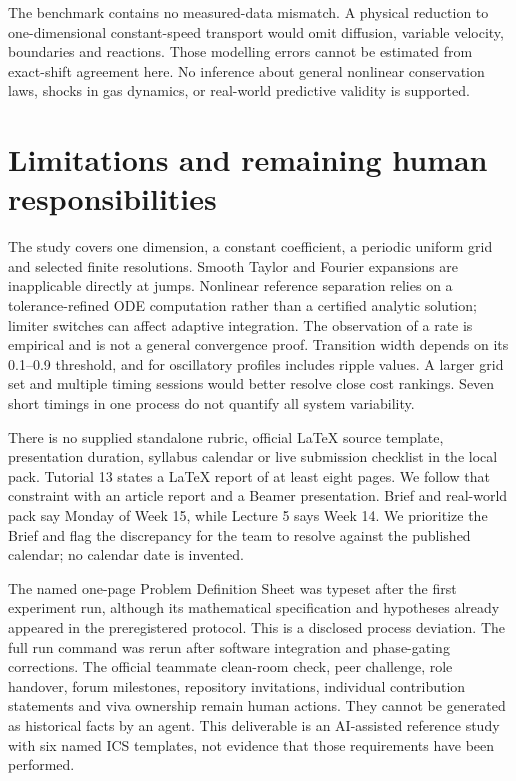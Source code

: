 The benchmark contains no measured-data mismatch. A physical reduction to one-dimensional constant-speed transport would omit diffusion, variable velocity, boundaries and reactions. Those modelling errors cannot be estimated from exact-shift agreement here. No inference about general nonlinear conservation laws, shocks in gas dynamics, or real-world predictive validity is supported.

\section{Limitations and remaining human responsibilities}
The study covers one dimension, a constant coefficient, a periodic uniform grid and selected finite resolutions. Smooth Taylor and Fourier expansions are inapplicable directly at jumps. Nonlinear reference separation relies on a tolerance-refined ODE computation rather than a certified analytic solution; limiter switches can affect adaptive integration. The observation of a rate is empirical and is not a general convergence proof. Transition width depends on its 0.1--0.9 threshold, and for oscillatory profiles includes ripple values. A larger grid set and multiple timing sessions would better resolve close cost rankings. Seven short timings in one process do not quantify all system variability.

There is no supplied standalone rubric, official LaTeX source template, presentation duration, syllabus calendar or live submission checklist in the local pack. Tutorial 13 states a LaTeX report of at least eight pages. We follow that constraint with an article report and a Beamer presentation. Brief and real-world pack say Monday of Week 15, while Lecture 5 says Week 14. We prioritize the Brief and flag the discrepancy for the team to resolve against the published calendar; no calendar date is invented.

The named one-page Problem Definition Sheet was typeset after the first experiment run, although its mathematical specification and hypotheses already appeared in the preregistered protocol. This is a disclosed process deviation. The full run command was rerun after software integration and phase-gating corrections. The official teammate clean-room check, peer challenge, role handover, forum milestones, repository invitations, individual contribution statements and viva ownership remain human actions. They cannot be generated as historical facts by an agent. This deliverable is an AI-assisted reference study with six named ICS templates, not evidence that those requirements have been performed.

